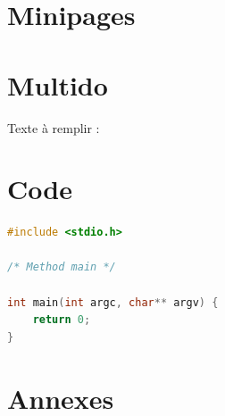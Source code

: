 \documentclass[a4paper]{article}
\newcommand{\emptyLines}[1]{%
\multido{\iN=1+1}{#1}{\phantom{}\dotfill\newline}
}
\begin{document}
\section{Minipages}
\hspace{0.5cm}%

\section{Multido}

Texte à remplir :

\emptyLines{10}

\section{Code}

\begin{lstlisting}[language=C,title=Code C,captionpos=b]
#include <stdio.h>
	
/* Method main */
	
int main(int argc, char** argv) {
	return 0;
}
\end{lstlisting}




\section*{Annexes} %
\end{document}
